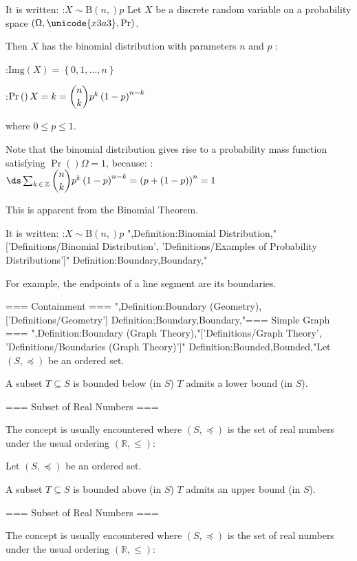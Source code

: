 It is written:
:$X \sim \mathrm B \left( n,   \right)p$
Let $X$ be a discrete random variable on a probability space $\left( \Omega, \unicode{x3a3}, \Pr \right)$.


Then $X$ has the binomial distribution with parameters $n$ and $p$ :

:$\mathrm {Img} \left( X \right) = \left\lbrace 0, 1, \ldots, n \right\rbrace$

:$\Pr \left(   \right){X = k} = \dbinom n k p^k \left( 1 - p \right)^{n - k}$

where $0 \le p \le 1$.


Note that the binomial distribution gives rise to a probability mass function satisfying $\Pr \left(   \right)\Omega = 1$, because:
:$\ds \sum_{k \mathop \in \mathbb Z} \dbinom n k p^k \left( 1 - p \right)^{n - k} = \left( p + \left( 1 - p \right)  \right)^n = 1$

This is apparent from the Binomial Theorem.


It is written:
:$X \sim \mathrm B \left( n,   \right)p$
",Definition:Binomial Distribution,"['Definitions/Binomial Distribution', 'Definitions/Examples of Probability Distributions']"
Definition:Boundary,Boundary,"

For example, the endpoints of a line segment are its boundaries.


=== Containment ===
",Definition:Boundary (Geometry),['Definitions/Geometry']
Definition:Boundary,Boundary,"=== Simple Graph ===
",Definition:Boundary (Graph Theory),"['Definitions/Graph Theory', 'Definitions/Boundaries (Graph Theory)']"
Definition:Bounded,Bounded,"Let $\left( S, \preceq \right)$ be an ordered set.


A subset $T \subseteq S$ is bounded below (in $S$)  $T$ admits a lower bound (in $S$).


=== Subset of Real Numbers ===

The concept is usually encountered where $\left( S, \preceq \right)$ is the set of real numbers under the usual ordering $\left( \mathbb R, \le \right)$:


Let $\left( S, \preceq \right)$ be an ordered set.


A subset $T \subseteq S$ is bounded above (in $S$)  $T$ admits an upper bound (in $S$).


=== Subset of Real Numbers ===

The concept is usually encountered where $\left( S, \preceq \right)$ is the set of real numbers under the usual ordering $\left( \mathbb R, \le \right)$:



